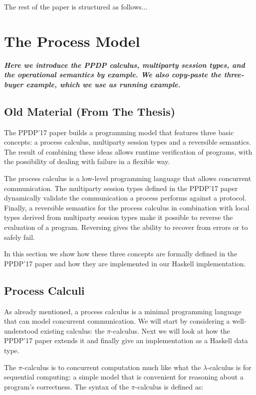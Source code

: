 \documentclass[runningheads,plain]{llncs}
\begin{document}
The rest of the paper is structured as follows...

\section{The Process Model}
\textbf{\emph{Here we introduce the PPDP calculus, multiparty session types, and the operational semantics by example. We also copy-paste the three-buyer example, which we use as running example.}}

\subsection{Old Material (From The Thesis)}
The PPDP'17 paper builds a programming model that features three basic
concepts: a process calculus, multiparty session types and a reversible
semantics. The result of combining these ideas allows runtime
verification of programs, with the possibility of dealing with failure
in a flexible way.

The process calculus is a low-level programming language that allows
concurrent communication. The multiparty session types defined in the
PPDP'17 paper dynamically validate the communication a process performs
against a protocol. Finally, a reversible semantics for the process
calculus in combination with local types derived from multiparty session
types make it possible to reverse the evaluation of a program. Reversing
gives the ability to recover from errors or to safely fail.

In this section we show how these three concepts are formally defined in
the PPDP'17 paper and how they are implemented in our Haskell
implementation.

\subsection{Process Calculi}\label{process-calculi}

As already mentioned, a process calculus is a minimal programming
language that can model concurrent communication. We will start by
considering a well-understood existing calculus: the \(\pi\)-calculus.
Next we will look at how the PPDP'17 paper extends it and finally give
an implementation as a Haskell data type.

The \(\pi\)-calculus is to concurrent computation much like what the
\(\lambda\)-calculus is for sequential computing: a simple model that is
convenient for reasoning about a program's correctness. The syntax of
the \(\pi\)-calculus is defined as:
\end{document}
